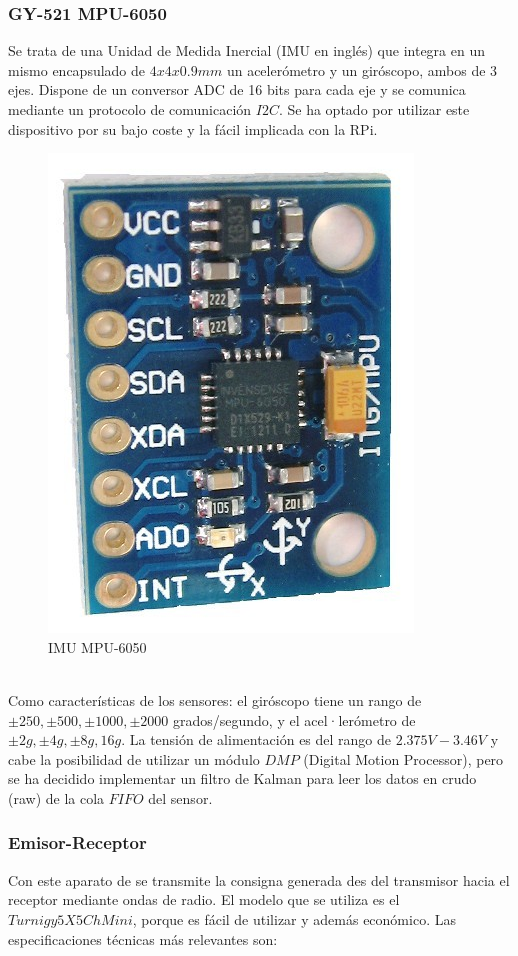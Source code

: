 \documentclass[twoside,11pt]{report}
\begin{document}
\subsubsection*{GY-521 MPU-6050} 
Se trata de una Unidad de Medida Inercial (IMU en inglés) que integra en un mismo encapsulado de $4x4x0.9mm$ un acelerómetro y un giróscopo, ambos de 3 ejes. Dispone de un conversor ADC de 16 bits para cada eje y se comunica mediante un protocolo de comunicación $I2C$. Se ha optado por utilizar este dispositivo por su bajo coste y la fácil implicada con la RPi.
\begin{figure}[h!]
\begin{center}
\includegraphics[scale=0.12]{images/mpu-6050.jpg} 
\caption{IMU MPU-6050}
\end{center}
\end{figure}\\
Como características de los sensores: el giróscopo tiene un rango de  $\pm250,\pm500,\pm1000,\pm2000$ grados/segundo, y el acel·lerómetro de $\pm2g,\pm4g,\pm8g,16g$. La tensión de alimentación es del rango de $2.375V-3.46V$ y cabe la posibilidad de utilizar un módulo $DMP$ (Digital Motion Processor), pero se ha decidido implementar un filtro de Kalman para leer los datos en crudo (raw) de la cola $FIFO$ del sensor.

\subsubsection*{Emisor-Receptor}
Con este aparato de se transmite la consigna generada des del transmisor hacia el receptor mediante ondas de radio. El modelo que se utiliza es el $Turnigy 5X 5Ch Mini$, porque es fácil de utilizar y además económico. Las especificaciones técnicas más relevantes son: 
\end{document}
